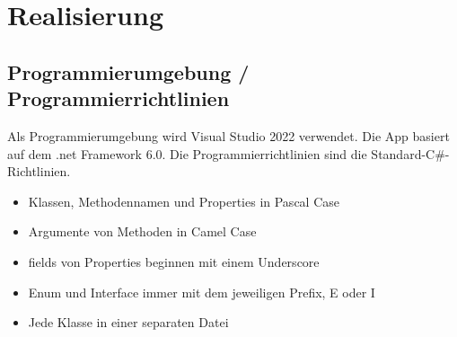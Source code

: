 \section{Realisierung}

\subsection{Programmierumgebung / Programmierrichtlinien}
Als Programmierumgebung wird Visual Studio 2022 verwendet. Die App basiert auf dem .net Framework 6.0. Die Programmierrichtlinien sind die Standard-C\#-Richtlinien.
\begin{itemize}
  \item Klassen, Methodennamen und Properties in Pascal Case
  \item Argumente von Methoden in Camel Case
  \item fields von Properties beginnen mit einem Underscore
  \item Enum und Interface immer mit dem jeweiligen Prefix, E oder I
  \item Jede Klasse in einer separaten Datei
\end{itemize}

